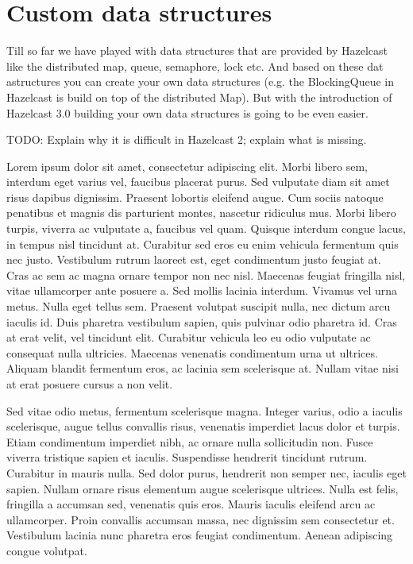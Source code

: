 \chapter{Custom data structures}

Till so far we have played with data structures that are provided by Hazelcast like
the distributed map, queue, semaphore, lock etc. And based on these dat astructures 
you can create your own data structures (e.g. the BlockingQueue in Hazelcast is build
on top of the distributed Map). But with the introduction of Hazelcast 3.0 building 
your own data structures is going to be even easier.

TODO: Explain why it is difficult in Hazelcast 2; explain what is missing.

Lorem ipsum dolor sit amet, consectetur adipiscing elit. Morbi libero sem,
interdum eget varius vel, faucibus placerat purus. Sed vulputate diam sit amet
risus dapibus dignissim. Praesent lobortis eleifend augue. Cum sociis natoque
penatibus et magnis dis parturient montes, nascetur ridiculus mus. Morbi libero
turpis, viverra ac vulputate a, faucibus vel quam. Quisque interdum congue
lacus, in tempus nisl tincidunt at. Curabitur sed eros eu enim vehicula
fermentum quis nec justo. Vestibulum rutrum laoreet est, eget condimentum justo
feugiat at. Cras ac sem ac magna ornare tempor non nec nisl. Maecenas feugiat
fringilla nisl, vitae ullamcorper ante posuere a. Sed mollis lacinia interdum.
Vivamus vel urna metus. Nulla eget tellus sem. Praesent volutpat suscipit nulla,
nec dictum arcu iaculis id. Duis pharetra vestibulum sapien, quis pulvinar odio
pharetra id. Cras at erat velit, vel tincidunt elit. Curabitur vehicula leo eu
odio vulputate ac consequat nulla ultricies. Maecenas venenatis condimentum
urna ut ultrices. Aliquam blandit fermentum eros, ac lacinia sem scelerisque
at. Nullam vitae nisi at erat posuere cursus a non velit.


Sed vitae odio metus, fermentum scelerisque magna. Integer varius, odio a
iaculis scelerisque, augue tellus convallis risus, venenatis imperdiet lacus
dolor et turpis. Etiam condimentum imperdiet nibh, ac ornare nulla sollicitudin
non. Fusce viverra tristique sapien et iaculis. Suspendisse hendrerit tincidunt
rutrum. Curabitur in mauris nulla. Sed dolor purus, hendrerit non semper nec,
iaculis eget sapien. Nullam ornare risus elementum augue scelerisque ultrices.
Nulla est felis, fringilla a accumsan sed, venenatis quis eros. Mauris iaculis
eleifend arcu ac ullamcorper. Proin convallis accumsan massa, nec dignissim sem
consectetur et. Vestibulum lacinia nunc pharetra eros feugiat condimentum.
Aenean adipiscing congue volutpat.


